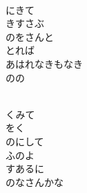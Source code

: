 \documentclass[10pt,b5j]{tarticle} %
\begin{document}
\begin{enumerate}
\begin{minipage}[c]{\blocksize}
        \vspace{\linespace}
        \item~\\
        にきて\\
        きすさぶ\\
        のをさんと\\
        とれば\\
        あはれなきもなき\\
        のの
        
        \vspace{\linespace}
        \item~\\
        くみて\\
        をく\\
        のにして\\
        ふのよ\\
        すあるに\\
        のなさんかな
    
    \end{minipage}
\end{enumerate} %
\end{document}
